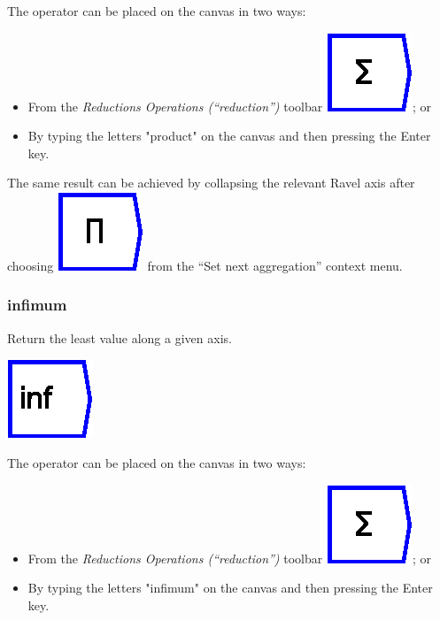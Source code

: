 The operator can be placed on the canvas in two ways:
\begin{itemize}
\item From the \emph{Reductions Operations (``reduction'')} toolbar \includegraphics{images/sum};
or 
\item By typing the letters "product" on the canvas and then pressing
the Enter key.
\end{itemize}
The same result can be achieved by collapsing the relevant Ravel axis
after choosing \includegraphics{images/product} from the ``Set next
aggregation'' context menu.

\subsubsection{infimum}

\label{Operation:infimum} Return the least value along a given axis.

\includegraphics{images/infimum}

The operator can be placed on the canvas in two ways:
\begin{itemize}
\item From the \emph{Reductions Operations (``reduction'')} toolbar \includegraphics{images/sum};
or 
\item By typing the letters "infimum" on the canvas and then pressing
the Enter key.
\end{itemize}

